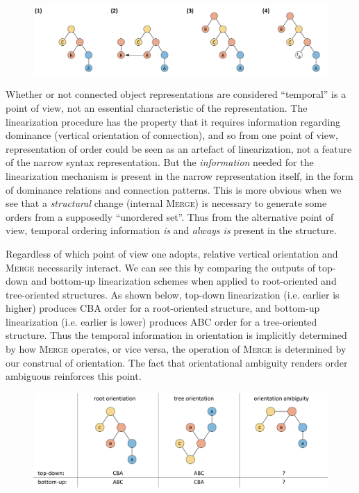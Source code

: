   
\begin{figure}
\includegraphics[width=\textwidth]{figures/Tilsen-img43.png}
\caption{\missingcaption}
\label{fig:}
\end{figure}
 

  Whether or not connected object representations are considered “temporal” is a point of view, not an essential characteristic of the representation. The linearization procedure has the property that it requires information regarding dominance (vertical orientation of connection), and so from one point of view, representation of order could be seen as an artefact of linearization, not a feature of the narrow syntax representation. But the \textit{information} needed for the linearization mechanism is present in the narrow representation itself, in the form of dominance relations and connection patterns. This is more obvious when we see that a \textit{structural} change (internal \textsc{Merge}) is necessary to generate some orders from a supposedly “unordered set”. Thus from the alternative point of view, temporal ordering information \textit{is} and \textit{always is} present in the structure. 

  Regardless of which point of view one adopts, relative vertical orientation and \textsc{Merge} necessarily interact. We can see this by comparing the outputs of top-down and bottom-up linearization schemes when applied to root-oriented and tree-oriented structures. As shown below, top-down linearization (i.e. earlier is higher) produces CBA order for a root-oriented structure, and bottom-up linearization (i.e. earlier is lower) produces ABC order for a tree-oriented structure. Thus the temporal information in orientation is implicitly determined by how \textsc{Merge} operates, or vice versa, the operation of \textsc{Merge} is determined by our construal of orientation. The fact that orientational ambiguity renders order ambiguous reinforces this point.

  
\begin{figure}
\includegraphics[width=\textwidth]{figures/Tilsen-img44.png}
\caption{\missingcaption}
\label{fig:}
\end{figure}
 

